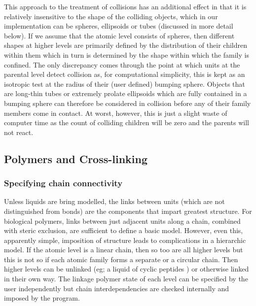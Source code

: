 This approach to the treatment of collisions has an additional effect
in that it is relatively insensitive to the shape of the colliding
objects, which in our implementation can be spheres,
ellipsoids or tubes (discussed in more detail below).  If we assume
that the atomic level consists of spheres, then different shapes at 
higher levels are primarily defined by the distribution of their
children within them which in turn is determined by the shape within
which the family is confined.  The only discrepancy comes through
the point at which units at the parental level detect collision as,
for computational simplicity, this is kept as an isotropic test at the
radius of their (user defined) bumping sphere.   Objects that are
long-thin tubes or extremely prolate ellipsoids which are fully contained
in a bumping sphere can therefore be considered in collision before
any of their family members come in contact.  At worst, however, this
is just a slight waste of computer time as the count of colliding
children will be zero and the parents will not react.

\subsection{Polymers and Cross-linking}

\subsubsection{Specifying chain connectivity}

Unless liquids are bring modelled, the links between units (which are not
distinguished from bonds) are the components that impart greatest structure.
For biological polymers, links between just adjacent units along a chain,
combined with steric exclusion, are sufficient to define a basic model. However,
even this, apparently simple, imposition of structure leads to complications
in a hierarchic model.  If the atomic level is a linear chain, then so too
are all higher levels but this is not so if each atomic family forms a separate
or a circular chain.  Then higher levels can be unlinked (eg; a liquid of cyclic
peptides \cite{TaylorWRet11a}) or otherwise linked in their own way.  The linkage polymer state of
each level can be specified by the user independently but chain interdependencies
are checked internally and imposed by the program.

